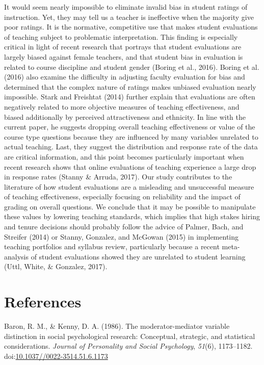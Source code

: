 \documentclass[man]{apa6}
\theoremstyle{definition}
\theoremstyle{definition}
\theoremstyle{definition}
\theoremstyle{remark}
\begin{document}
It would seem nearly impossible to eliminate invalid bias in student
ratings of instruction. Yet, they may tell us a teacher is ineffective
when the majority give poor ratings. It is the normative, competitive
use that makes student evaluations of teaching subject to problematic
interpretation. This finding is especially critical in light of recent
research that portrays that student evaluations are largely biased
against female teachers, and that student bias in evaluation is related
to course discipline and student gender (Boring et al., 2016). Boring et
al. (2016) also examine the difficulty in adjusting faculty evaluation
for bias and determined that the complex nature of ratings makes
unbiased evaluation nearly impossible. Stark and Freishtat (2014)
further explain that evaluations are often negatively related to more
objective measures of teaching effectiveness, and biased additionally by
perceived attractiveness and ethnicity. In line with the current paper,
he suggests dropping overall teaching effectiveness or value of the
course type questions because they are influenced by many variables
unrelated to actual teaching. Last, they suggest the distribution and
response rate of the data are critical information, and this point
becomes particularly important when recent research shows that online
evaluations of teaching experience a large drop in response rates
(Stanny \& Arruda, 2017). Our study contributes to the literature of how
student evaluations are a misleading and unsuccessful measure of
teaching effectiveness, especially focusing on reliability and the
impact of grading on overall questions. We conclude that it may be
possible to manipulate these values by lowering teaching standards,
which implies that high stakes hiring and tenure decisions should
probably follow the advice of Palmer, Bach, and Streifer (2014) or
Stanny, Gonzalez, and McGowan (2015) in implementing teaching portfolios
and syllabus review, particularly because a recent meta-analysis of
student evaluations showed they are unrelated to student learning (Uttl,
White, \& Gonzalez, 2017).

\newpage

\hypertarget{references}{%
\section{References}\label{references}}

\setlength{\parindent}{-0.5in}
\setlength{\leftskip}{0.5in}

\hypertarget{refs}{}
\leavevmode\hypertarget{ref-Baron1986}{}%
Baron, R. M., \& Kenny, D. A. (1986). The moderator-mediator variable
distinction in social psychological research: Conceptual, strategic, and
statistical considerations. \emph{Journal of Personality and Social
Psychology}, \emph{51}(6), 1173--1182.
doi:\href{https://doi.org/10.1037//0022-3514.51.6.1173}{10.1037//0022-3514.51.6.1173}
\end{document}
